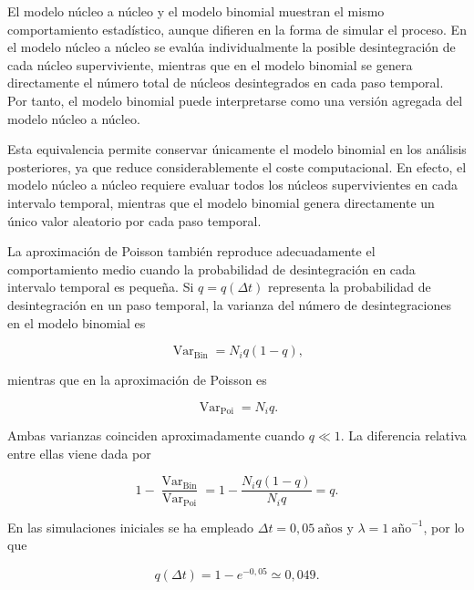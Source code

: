 \documentclass[12pt,a4paper]{article}
\begin{document}
El modelo núcleo a núcleo y el modelo binomial muestran el mismo comportamiento estadístico, aunque difieren en la forma de simular el proceso. En el modelo núcleo a núcleo se evalúa individualmente la posible desintegración de cada núcleo superviviente, mientras que en el modelo binomial se genera directamente el número total de núcleos desintegrados en cada paso temporal. Por tanto, el modelo binomial puede interpretarse como una versión agregada del modelo núcleo a núcleo.

Esta equivalencia permite conservar únicamente el modelo binomial en los análisis posteriores, ya que reduce considerablemente el coste computacional. En efecto, el modelo núcleo a núcleo requiere evaluar todos los núcleos supervivientes en cada intervalo temporal, mientras que el modelo binomial genera directamente un único valor aleatorio por cada paso temporal.

La aproximación de Poisson también reproduce adecuadamente el comportamiento medio cuando la probabilidad de desintegración en cada intervalo temporal es pequeña. Si $q=q(\Delta t)$ representa la probabilidad de desintegración en un paso temporal, la varianza del número de desintegraciones en el modelo binomial es

\begin{equation}
    \operatorname{Var}_{\mathrm{Bin}}=N_iq(1-q),
\end{equation}

mientras que en la aproximación de Poisson es

\begin{equation}
    \operatorname{Var}_{\mathrm{Poi}}=N_iq.
\end{equation}

Ambas varianzas coinciden aproximadamente cuando $q\ll 1$. La diferencia relativa entre ellas viene dada por

\begin{equation}
    1-\frac{\operatorname{Var}_{\mathrm{Bin}}}
    {\operatorname{Var}_{\mathrm{Poi}}}
    =
    1-\frac{N_iq(1-q)}{N_iq}
    =
    q.
    \label{eq:diferencia_varianzas_poisson}
\end{equation}

En las simulaciones iniciales se ha empleado $\Delta t=0{,}05~\text{años}$ y $\lambda=1~\text{año}^{-1}$, por lo que

\begin{equation}
    q(\Delta t)=1-e^{-0{,}05}\simeq 0{,}049.
\end{equation}
\end{document}
